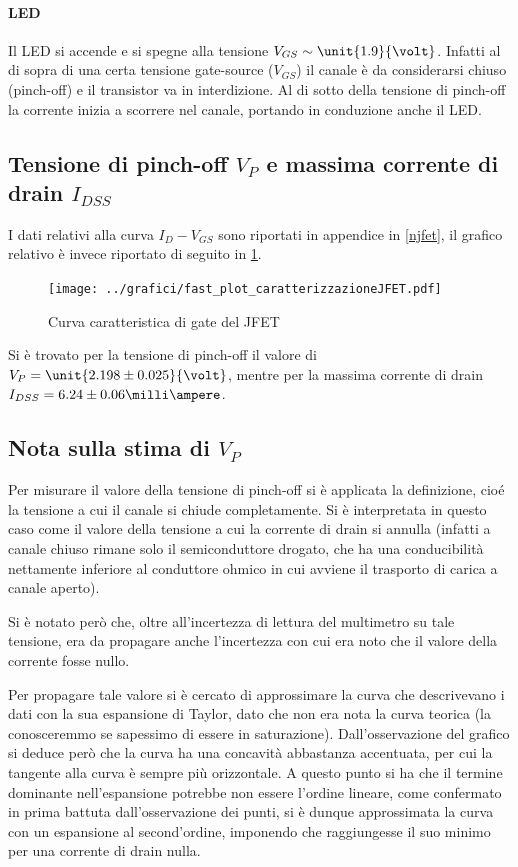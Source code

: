 \documentclass[10pt,a4paper]{article}
\begin{document}
\paragraph{LED} Il LED si accende e si spegne alla tensione $V_{GS} \sim \unit{1.9}{\volt}$. Infatti al di sopra di una certa tensione gate-source ($V_{GS}$) il canale è da considerarsi chiuso (pinch-off) e il transistor va in interdizione. Al di sotto della tensione di pinch-off la corrente inizia a scorrere nel canale, portando in conduzione anche il LED.

\subsection{Tensione di pinch-off $V_P$ e massima corrente di drain $I_{DSS}$}
I dati relativi alla curva $I_D - V_{GS}$ sono riportati in appendice in \tablename{\ref{njfet}}, il grafico relativo è invece riportato di seguito in \figurename{\ref{fig:njfet}}.

\begin{figure}[h!]
	\centering
	\texttt{[image: ../grafici/fast\_plot\_caratterizzazioneJFET.pdf]}
	\caption{Curva caratteristica di gate del JFET}
	\label{fig:njfet}
\end{figure}

Si è trovato per la tensione di pinch-off il valore di $V_P = \unit{2.198 \pm 0.025}{\volt} $, mentre per la massima corrente di drain $I_{DSS} = {6.24 \pm 0.06}{\milli\ampere} $.

\subsection{Nota sulla stima di $V_P$}
Per misurare il valore della tensione di pinch-off si è applicata la definizione, cioé la tensione a cui il canale si chiude completamente. Si è interpretata in questo caso come il valore della tensione a cui la corrente di drain si annulla (infatti a canale chiuso rimane solo il semiconduttore drogato, che ha una conducibilità nettamente inferiore al conduttore ohmico in cui avviene il trasporto di carica a canale aperto).

Si è notato però che, oltre all'incertezza di lettura del multimetro su tale tensione, era da propagare anche l'incertezza con cui era noto che il valore della corrente fosse nullo.

Per propagare tale valore si è cercato di approssimare la curva che descrivevano i dati con la sua espansione di Taylor, dato che non era nota la curva teorica (la conosceremmo se sapessimo di essere in saturazione).
Dall'osservazione del grafico si deduce però che la curva ha una concavità abbastanza accentuata, per cui la tangente alla curva è sempre più orizzontale. A questo punto si ha che il termine dominante nell'espansione potrebbe non essere l'ordine lineare, come confermato in prima battuta dall'osservazione dei punti, si è dunque approssimata la curva con un espansione al second'ordine, imponendo che raggiungesse il suo minimo per una corrente di drain nulla.
\end{document}
